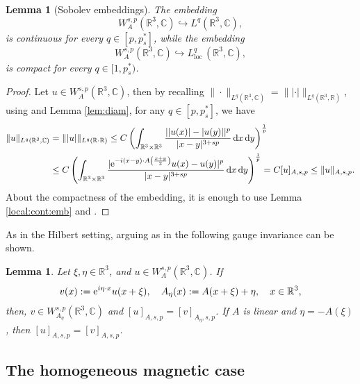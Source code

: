 \documentclass[leqno,11pt]{amsart}
\newcommand{\R}{\mathbb R}
\newcommand{\CC}{\mathbb C}
\newcommand{\C}{\mathbb C}
\newcommand{\loc}{\mathrm{loc}\,}
\numberwithin{equation}{section}
\newtheorem{lemma}[theorem]{Lemma}
\def\e{{\rm e}}
\newcommand{\expAminus}{\e^{-i(x-y)\cdot A\left(\frac{x+y}{2}\right)}}
\begin{document}
\begin{lemma}[Sobolev embeddings]
\label{Sobolev:emedding:lemma}
The embedding
    \begin{equation}
        W^{s,p}_A(\R^3,\CC) \hookrightarrow L^q(\R^3,\CC),
    \end{equation}
    is continuous for every $q \in [p,p^*_s]$, while the embedding
    \begin{equation}
        W^{s,p}_A(\R^3,\CC) \hookrightarrow L^q_\loc(\R^3,\CC),
    \end{equation}
   is compact for every $q \in [1,p^*_s)$.
\end{lemma}
\begin{proof}
    Let $u \in W^{s,p}_A(\R^3,\CC)$, then by recalling $\|\cdot\|_{L^q(\R^3,\CC)}=\| |\cdot| \|_{L^q(\R^3,\R)}$, using \cite[Theorem 6.5]{DiPaVa} and Lemma \ref{lem:diam}, for any $q \in [p,p^*_s]$, we have
    \begin{equation}
        \begin{aligned}
            \|u\|_{L^q(\R^3,\CC)}
            &=
            \||u|\|_{L^q(\R^,\R) }
            \leq
            C\left(\int_{\R^3\times \R^3} \frac{||u(x)|-|u(y)||^p}{|x-y|^{3+sp}} \dd x \dd y\right)^\frac1p\\
            &\leq
            C\left(\int_{\R^3\times \R^3} \frac{|\expAminus u(x)-u(y)|^p}{|x-y|^{3+sp}} \dd x \dd y\right)^\frac1p=
            C[u]_{A,s,p}
            \leq
            \|u\|_{A,s,p}.
        \end{aligned}
    \end{equation}
About the compactness of the embedding, it is enough to use Lemma \ref{local:cont:emb} and \cite[Corollary 7.2]{DiPaVa}.
\end{proof}

As in the Hilbert setting, arguing as in \cite[Lemma 3.10 and Lemma 3.11]{dAveniaSquassina} the following gauge invariance can be shown.
\begin{lemma}
    Let $\xi, \eta \in \R^3$, and $u \in W^{s,p}_A(\R^3,\C)$. If 
\[
    v(x):=\e^{i\eta\cdot x}u(x+\xi), \quad A_{\eta}(x):=A(x+\xi) + \eta, \quad x \in \R^3,
\]
then, $v \in W^{s,p}_{A_\eta}(\R^3,\C)$ and $[u]_{A,s,p} = [v]_{A_\eta,s,p}$.
If $A$ is linear and $\eta=-A(\xi)$, then $[u]_{A,s,p} = [v]_{A,s,p}$.
\end{lemma}





\subsection{The homogeneous magnetic case}\label{hom:magn}
\end{document}
